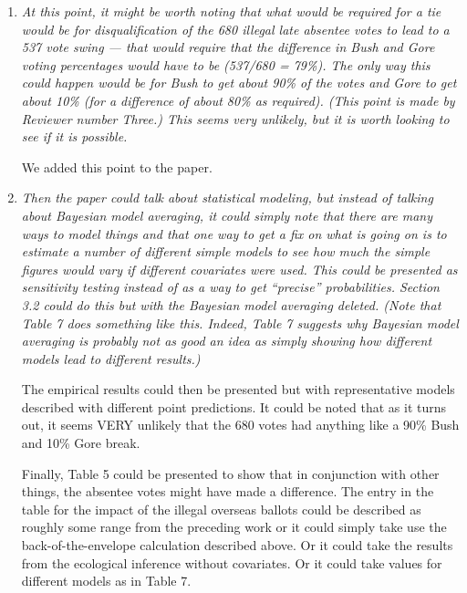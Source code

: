 \documentclass[11pt]{article}
\begin{document}
\begin{enumerate}
\item {\it At this point, it might be worth noting that what would be
    required for a tie would be for disqualification of the 680
    illegal late absentee votes to lead to a 537 vote swing --- that
    would require that the difference in Bush and Gore voting
    percentages would have to be (537/680 = 79\%).  The only way this
    could happen would be for Bush to get about 90\% of the votes and
    Gore to get about 10\% (for a difference of about 80\% as
    required).  (This point is made by Reviewer number Three.)  This
    seems very unlikely, but it is worth looking to see if it is
    possible. }

  We added this point to the paper.
  
\item {\it Then the paper could talk about statistical modeling, but
    instead of talking about Bayesian model averaging, it could simply
    note that there are many ways to model things and that one way to
    get a fix on what is going on is to estimate a number of different
    simple models to see how much the simple figures would vary if
    different covariates were used.  This could be presented as
    sensitivity testing instead of as a way to get ``precise''
    probabilities.  Section 3.2 could do this but with the Bayesian
    model averaging deleted.  (Note that Table 7 does something like
    this.  Indeed, Table 7 suggests why Bayesian model averaging is
    probably not as good an idea as simply showing how different
    models lead to different results.) 
    
    The empirical results could then be presented but with
    representative models described with different point predictions.
    It could be noted that as it turns out, it seems VERY unlikely
    that the 680 votes had anything like a 90\% Bush and 10\% Gore
    break.
  
    Finally, Table 5 could be presented to show that in conjunction
    with other things, the absentee votes might have made a
    difference.  The entry in the table for the impact of the illegal
    overseas ballots could be described as roughly some range from the
    preceding work or it could simply take use the
    back-of-the-envelope calculation described above.  Or it could
    take the results from the ecological inference without covariates.
    Or it could take values for different models as in Table 7.}
  

\end{enumerate}
\end{document}
